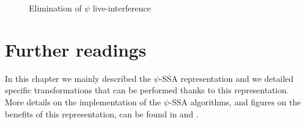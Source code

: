 \begin{figure}
\begin{center}
\footnotesize
\hfill
{}
\hfill
{}
\hfill
{}
\caption{Elimination of $\psi$ live-interference}
\label{fig:live_interference}
\end{center}
\end{figure}


\section{Further readings}

In this chapter we mainly described the $\psi$-SSA representation and we detailed specific transformations that can be performed thanks to this representation. More details on the implementation of the $\psi$-SSA algorithms, and figures on the benefits of this representation, can be found in \cite{Stoutchinin:2001:MICRO} and \cite{Ferriere:2007:SCOPES}.

